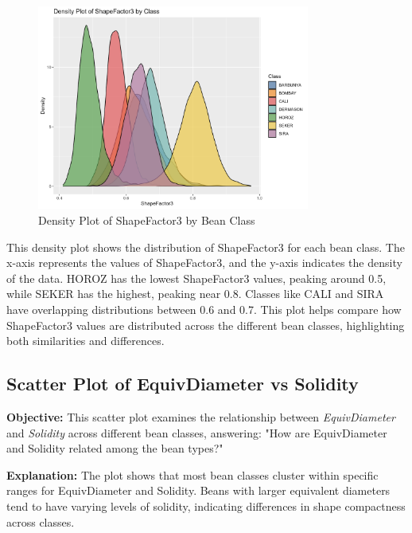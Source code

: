 \documentclass[a4paper,12pt]{article}
\begin{document}
\begin{figure}[H]
    \centering
    \includegraphics[width=0.8\textwidth]{graphs/density_shapefactor3.png}
    \caption{Density Plot of ShapeFactor3 by Bean Class}
    \label{fig:density_shapefactor3}
\end{figure}
This density plot shows the distribution of ShapeFactor3 for each bean class. The x-axis represents the values of ShapeFactor3, and the y-axis indicates the density of the data. HOROZ has the lowest ShapeFactor3 values, peaking around 0.5, while SEKER has the highest, peaking near 0.8. Classes like CALI and SIRA have overlapping distributions between 0.6 and 0.7. This plot helps compare how ShapeFactor3 values are distributed across the different bean classes, highlighting both similarities and differences.

\newpage

\subsection{Scatter Plot of EquivDiameter vs Solidity}
\noindent\textbf{Objective:} This scatter plot examines the relationship between \textit{EquivDiameter} and \textit{Solidity} across different bean classes, answering: "How are EquivDiameter and Solidity related among the bean types?"

\noindent\textbf{Explanation:} The plot shows that most bean classes cluster within specific ranges for EquivDiameter and Solidity. Beans with larger equivalent diameters tend to have varying levels of solidity, indicating differences in shape compactness across classes.
\end{document}
